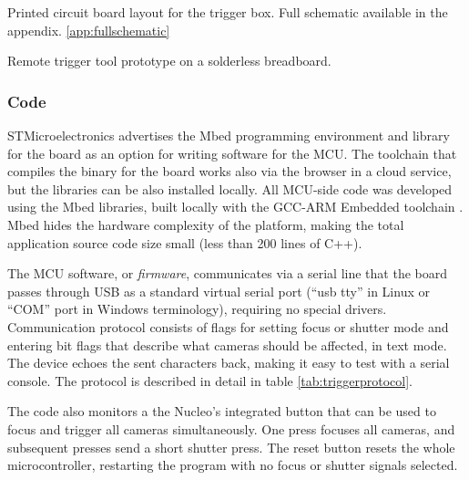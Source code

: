 
{Printed circuit board layout for the trigger box. Full schematic available in the appendix. \ref{app:fullschematic}}

{Remote trigger tool prototype on a solderless breadboard.}


\subsubsection{Code}

STMicroelectronics advertises the Mbed programming environment and library for the board as an option for writing software for the MCU.
The toolchain that compiles the binary for the board works also via the browser in a cloud service, but the libraries can be also installed locally.
All MCU-side code was developed using the Mbed libraries, built locally with the GCC-ARM Embedded toolchain \cite{launchpad-gcc-arm}.
Mbed hides the hardware complexity of the platform, making the total application source code size small (less than 200 lines of C++).

The MCU software, or \emph{firmware}, communicates via a serial line that the board passes through USB as a standard virtual serial port (``usb tty'' in Linux or ``COM'' port in Windows terminology), requiring no special drivers.
Communication protocol consists of flags for setting focus or shutter mode and entering bit flags that describe what cameras should be affected, in text mode.
The device echoes the sent characters back, making it easy to test with a serial console.
The protocol is described in detail in table \ref{tab:triggerprotocol}.

The code also monitors a the Nucleo's integrated button that can be used to focus and trigger all cameras simultaneously.
One press focuses all cameras, and subsequent presses send a short shutter press.
The reset button resets the whole microcontroller, restarting the program with no focus or shutter signals selected.

